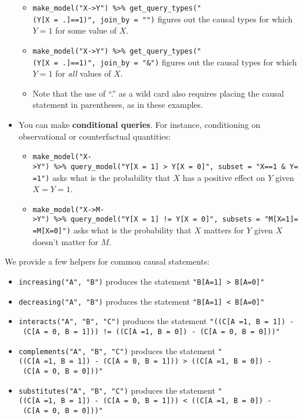 \documentclass[
  12pt,
]{book}
\providecommand{\tightlist}{%
  \setlength{\itemsep}{0pt}\setlength{\parskip}{0pt}}
\begin{document}
\begin{itemize}
  \begin{itemize}
  \tightlist
  \item
    \texttt{make\_model("X-\textgreater{}Y")\ \%\textgreater{}\%\ get\_query\_types("(Y{[}X\ =\ .{]}==1)",\ join\_by\ =\ "\textbar{}")} figures out the causal types for which \(Y=1\) for some value of \(X\).
  \item
    \texttt{make\_model("X-\textgreater{}Y")\ \%\textgreater{}\%\ get\_query\_types("(Y{[}X\ =\ .{]}==1)",\ join\_by\ =\ "\&")} figures out the causal types for which \(Y=1\) for \emph{all} values of \(X\).
  \item
    Note that the use of ``.'' as a wild card also requires placing the causal statement in parentheses, as in these examples.
  \end{itemize}
\item
  You can make \textbf{conditional queries}. For instance, conditioning on observational or counterfactual quantities:

  \begin{itemize}
  \tightlist
  \item
    \texttt{make\_model("X-\textgreater{}Y")\ \%\textgreater{}\%\ query\_model("Y{[}X\ =\ 1{]}\ \textgreater{}\ Y{[}X\ =\ 0{]}",\ subset\ =\ "X==1\ \&\ Y==1")}
    asks what is the probability that \(X\) has a positive effect on \(Y\) given \(X=Y=1\).
  \item
    \texttt{make\_model("X-\textgreater{}M-\textgreater{}Y")\ \%\textgreater{}\%\ query\_model("Y{[}X\ =\ 1{]}\ !=\ Y{[}X\ =\ 0{]}",\ subsets\ =\ "M{[}X=1{]}==M{[}X=0{]}")}
    asks what is the probability that \(X\) matters for \(Y\) given \(X\) doesn't matter for \(M\).
  \end{itemize}
\end{itemize}

We provide a few helpers for common causal statements:

\begin{itemize}
\tightlist
\item
  \texttt{increasing("A",\ "B")} produces the statement \texttt{"B{[}A=1{]}\ \textgreater{}\ B{[}A=0{]}"}
\item
  \texttt{decreasing("A",\ "B")} produces the statement \texttt{"B{[}A=1{]}\ \textless{}\ B{[}A=0{]}"}
\item
  \texttt{interacts("A",\ "B",\ "C")} produces the statement \texttt{"((C{[}A\ =1,\ B\ =\ 1{]})\ -\ (C{[}A\ =\ 0,\ B\ =\ 1{]}))\ !=\ ((C{[}A\ =1,\ B\ =\ 0{]})\ -\ (C{[}A\ =\ 0,\ B\ =\ 0{]}))"}
\item
  \texttt{complements("A",\ "B",\ "C")} produces the statement \texttt{"((C{[}A\ =1,\ B\ =\ 1{]})\ -\ (C{[}A\ =\ 0,\ B\ =\ 1{]}))\ \textgreater{}\ ((C{[}A\ =1,\ B\ =\ 0{]})\ -\ (C{[}A\ =\ 0,\ B\ =\ 0{]}))"}
\item
  \texttt{substitutes("A",\ "B",\ "C")} produces the statement \texttt{"((C{[}A\ =1,\ B\ =\ 1{]})\ -\ (C{[}A\ =\ 0,\ B\ =\ 1{]}))\ \textless{}\ ((C{[}A\ =1,\ B\ =\ 0{]})\ -\ (C{[}A\ =\ 0,\ B\ =\ 0{]}))"}
\end{itemize}
\end{document}
